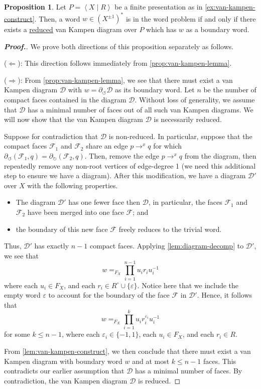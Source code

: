 \documentclass[11pt,a4paper,reqno]{amsart}
\theoremstyle{plain}
\theoremstyle{definition}
\newtheorem{proposition}[theorem]{Proposition}
\theoremstyle{definition}
\renewcommand\leq\leqslant
\newenvironment{myproof}{\begin{proof}[\normalfont\bfseries Proof.]}{\end{proof}}
\begin{document}
\begin{proposition}\label{prop:stong-van-kampen}
  Let $P = \left\langle X\mid R \right\rangle$ be a finite presentation as in \cref{ex:van-kampen-construct}.
  Then, a word $w\in (X^{\pm 1})^*$ is in the word problem if and only if there exists a \underline{reduced} van Kampen diagram over $P$ which has $w$ as a boundary word.
\end{proposition}

\begin{myproof}
We prove both directions of this proposition separately as follows.

\medskip
\noindent
($\Leftarrow$): This direction follows immediately from \cref{prop:van-kampen-lemma}.

\medskip
\noindent
($\Rightarrow$):
From \cref{prop:van-kampen-lemma}, we see that there must exist a van Kampen diagram $\mathcal D$ with $w = \partial_\circlearrowleft \mathcal D$ as its boundary word.
Let $n$ be the number of compact faces contained in the diagram $\mathcal D$.
Without loss of generality, we assume that $\mathcal D$ has a minimal number of faces out of all such van Kampen diagrams.
We will now show that the van Kampen diagram $\mathcal D$ is necessarily reduced.

Suppose for contradiction that $\mathcal D$ is non-reduced.
In  particular, suppose that the compact faces $\mathcal F_1$ and $\mathcal F_2$ share an edge $p\to^x q$ for which $\partial_{\circlearrowleft} (\mathcal F_1,q) = \partial_\circlearrowright (\mathcal F_2,q)$.
Then, remove the edge $p\to^x q$ from the diagram, then repeatedly remove any non-root vertices of edge-degree 1 (we need this additional step to ensure we have a diagram).
After this modification, we have a diagram $\mathcal D'$ over $X$ with the following properties.
\begin{itemize}
  \item The diagram $\mathcal D'$ has one fewer face then $\mathcal D$, in particular, the faces $\mathcal F_1$ and $\mathcal F_2$ have been merged into one face $\mathcal F$; and
  \item the boundary of this new face $\mathcal F$ freely reduces to the trivial word.
\end{itemize}
Thus, $\mathcal D'$ has exactly $n-1$ compact faces.
Applying \cref{lem:diagram-decomp} to $\mathcal D'$, we see that
\[
		w
		=_{F_X}
		\prod_{i=1}^{n-1}
    u_i r_i u_{i}^{-1}
\]
where each $u_i \in F_X$, and each $r_i \in R^\circ \cup \{ \varepsilon \}$.
Notice here that we include the empty word $\varepsilon$ to account for the boundary of the face $\mathcal F$ in $\mathcal D'$.
Hence, it follows that
\[
		w
		=_{F_X}
		\prod_{i=1}^{k}
    u_i r_i^{\varepsilon_i} u_{i}^{-1}
\]
for some $k\leq n-1$, where each $\varepsilon_i \in \{-1,1\}$, each $u_i \in F_X$, and each $r_i \in R$.

From \cref{lem:van-kampen-construct}, we then conclude that there must exist a van Kampen diagram with boundary word $w$ and at most $k\leq n-1$ faces.
This contradicts our earlier assumption that $\mathcal D$ has a minimal number of faces.
By contradiction, the van Kampen diagram $\mathcal D$ is reduced.
\end{myproof}
\end{document}
